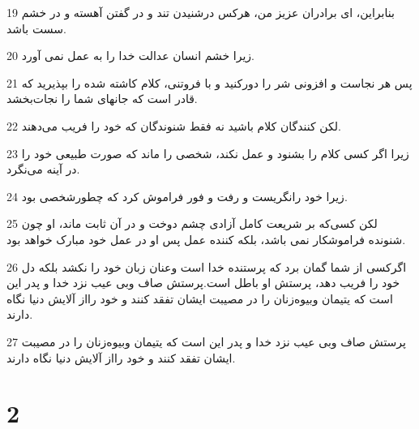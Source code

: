 \par 19 بنابراین، ای برادران عزیز من، هرکس درشنیدن تند و در گفتن آهسته و در خشم سست باشد.
\par 20 زیرا خشم انسان عدالت خدا را به عمل نمی آورد.
\par 21 پس هر نجاست و افزونی شر را دورکنید و با فروتنی، کلام کاشته شده را بپذیرید که قادر است که جانهای شما را نجات‌بخشد.
\par 22 لکن کنندگان کلام باشید نه فقط شنوندگان که خود را فریب می‌دهند.
\par 23 زیرا اگر کسی کلام را بشنود و عمل نکند، شخصی را ماند که صورت طبیعی خود را در آینه می‌نگرد.
\par 24 زیرا خود رانگریست و رفت و فور فراموش کرد که چطورشخصی بود.
\par 25 لکن کسی‌که بر شریعت کامل آزادی چشم دوخت و در آن ثابت ماند، او چون شنونده فراموشکار نمی باشد، بلکه کننده عمل پس او در عمل خود مبارک خواهد بود.
\par 26 اگرکسی از شما گمان برد که پرستنده خدا است وعنان زبان خود را نکشد بلکه دل خود را فریب دهد، پرستش او باطل است.پرستش صاف وبی عیب نزد خدا و پدر این است که یتیمان وبیوه‌زنان را در مصیبت ایشان تفقد کنند و خود رااز آلایش دنیا نگاه دارند.
\par 27 پرستش صاف وبی عیب نزد خدا و پدر این است که یتیمان وبیوه‌زنان را در مصیبت ایشان تفقد کنند و خود رااز آلایش دنیا نگاه دارند.

\chapter{2}

